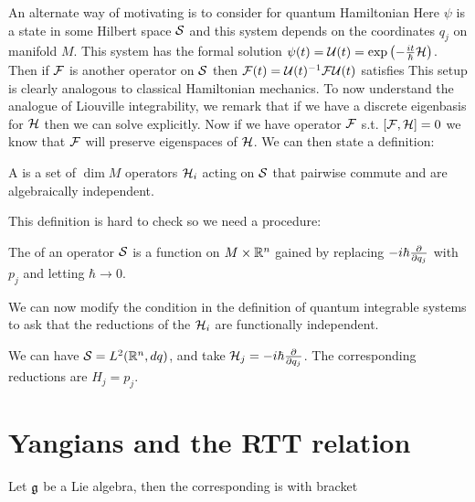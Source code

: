 \documentclass{article}
\begin{document}
An alternate way of motivating is to consider 
for quantum Hamiltonian 
Here $\psi$ is a state in some Hilbert space $\mc{S}$ and this system depends on the coordinates $q_j$ on manifold $M$. This system has the formal solution $\psi(t) =\mc{U}(t) =  \exp\pround{-\frac{it}{\hbar}\mc{H}}$. Then if $\mc{F}$ is another operator on $\mc{S}$ then $\mc{F}(t) = \mc{U}(t)^{-1} \mc{F} \mc{U}(t)$ satisfies 
This setup is clearly analogous to classical Hamiltonian mechanics. To now understand the analogue of Liouville integrability, we remark that if we have a discrete eigenbasis for $\mc{H}$ then we can solve explicitly. Now if we have operator $\mc{F}$ s.t. $\comm[\mc{F}]{\mc{H}}=0$ we know that $\mc{F}$ will preserve eigenspaces of $\mc{H}$. We can then state a definition:

\begin{definition}
	A  is a set of $\dim M$ operators $\mc{H}_i$ acting on $\mc{S}$ that pairwise commute and are algebraically independent. 
\end{definition}
This definition is hard to check so we need a procedure:
\begin{definition}
	The  of an operator $\mc{S}$ is a function on $M\times \mbb{R}^n$ gained by replacing $-i\hbar\pd{q_j}$ with $p_j$ and letting $\hbar \to 0$. 
\end{definition}
We can now modify the condition in the definition of quantum integrable systems to ask that the reductions of the $\mc{H}_i$ are functionally independent. 

\begin{example}
	We can have $\mc{S} = L^2(\mbb{R}^n,dq)$, and take $\mc{H}_j = -i\hbar \pd{q_j}$. The corresponding reductions are $H_j = p_j$. 
\end{example}
\section{Yangians and the RTT relation}

\begin{definition}
Let $\mf{g}$ be a Lie algebra, then the corresponding  is 
with bracket 
\end{definition}
\end{document}
